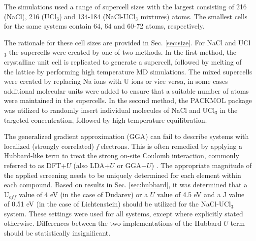 \documentclass[preprint,3p,10pt,onecolumn,number,sort&compress]{elsarticle}
\begin{document}
{\color{red}The simulations used a range of supercell sizes with the largest consisting of 216 (NaCl), 216 (UCl$_3$) and 134-184 (NaCl-UCl$_3$ mixtures) atoms. The smallest cells for the same systems contain 64, 64 and 60-72 atoms, respectively.  {\color{red} The rationale for these cell sizes are provided in Sec. \ref{sec:size}.
For NaCl and UCl$_3$ the supercells were created by one of two methods. In the first method, the crystalline unit cell is replicated to generate a supercell, followed by melting of the lattice by performing high temperature MD simulations. The mixed supercells were created by replacing Na ions with U ions or vice versa, in some cases additional molecular units were added to ensure that a suitable number of atoms were maintained in the supercells. In the second method, the PACKMOL package \cite{packmol} was utilized to randomly insert individual molecules of NaCl and UCl$_3$ in the targeted concentration, followed by high temperature equilibration.

The generalized gradient approximation (GGA) can fail to describe systems with localized (strongly correlated) \textit{f} electrons. This is often remedied by applying a Hubbard-like term to treat the strong on-site Coulomb interaction, commonly referred to as DFT+$U$ (also LDA+$U$ or GGA+$U$) \cite{rohrbach2003}. The appropriate magnitude of the applied screening needs to be uniquely determined for each element within each compound. {Based on results \color{red} in Sec. \ref{sec:hubbard}, it was determined that a U$_{eff}$ value of 4 eV (in the case of Dudarev) or a $U$ value of 4.5 eV and a J value of 0.51 eV (in the case of Lichtenstein) should be utilized for the NaCl-UCl$_3$ system. {\color{red}These settings were used for all systems, except where explicitly stated otherwise.} Differences between the two implementations of the Hubbard $U$ term should be statistically insignificant.}}


}
\end{document}
